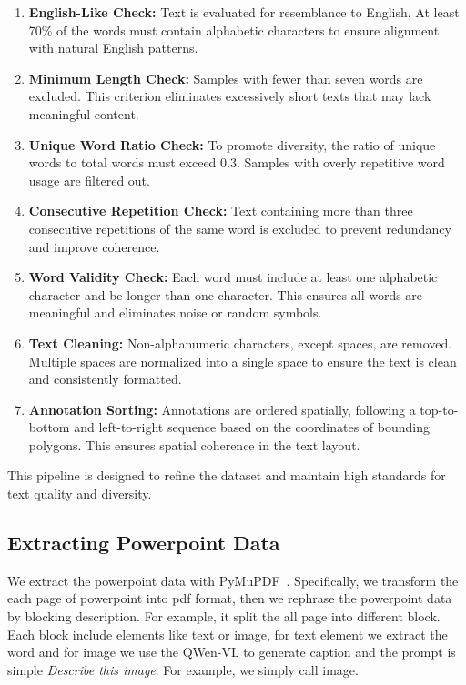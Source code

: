 \begin{enumerate}
    \item \textbf{English-Like Check:}  
    Text is evaluated for resemblance to English. At least 70\% of the words must contain alphabetic characters to ensure alignment with natural English patterns.
    
    \item \textbf{Minimum Length Check:}  
    Samples with fewer than seven words are excluded. This criterion eliminates excessively short texts that may lack meaningful content.
    
    \item \textbf{Unique Word Ratio Check:}  
    To promote diversity, the ratio of unique words to total words must exceed 0.3. Samples with overly repetitive word usage are filtered out.
    
    \item \textbf{Consecutive Repetition Check:}  
    Text containing more than three consecutive repetitions of the same word is excluded to prevent redundancy and improve coherence.
    
    \item \textbf{Word Validity Check:}  
    Each word must include at least one alphabetic character and be longer than one character. This ensures all words are meaningful and eliminates noise or random symbols.
    
    \item \textbf{Text Cleaning:}  
    Non-alphanumeric characters, except spaces, are removed. Multiple spaces are normalized into a single space to ensure the text is clean and consistently formatted.
    
    \item \textbf{Annotation Sorting:}  
    Annotations are ordered spatially, following a top-to-bottom and left-to-right sequence based on the coordinates of bounding polygons. This ensures spatial coherence in the text layout.
\end{enumerate}

This pipeline is designed to refine the dataset and maintain high standards for text quality and diversity.


\subsection{Extracting Powerpoint Data}
We extract the powerpoint data with PyMuPDF~\cite{pymupdf}.
Specifically, we transform the each page of powerpoint into pdf format, then we rephrase the powerpoint data by blocking description.
For example, it split the all page into different block.
Each block include elements like text or image, for text element we extract the word and for image we use the QWen-VL to generate caption and the prompt is simple \textit{Describe this image}.
For example, we simply call image.

